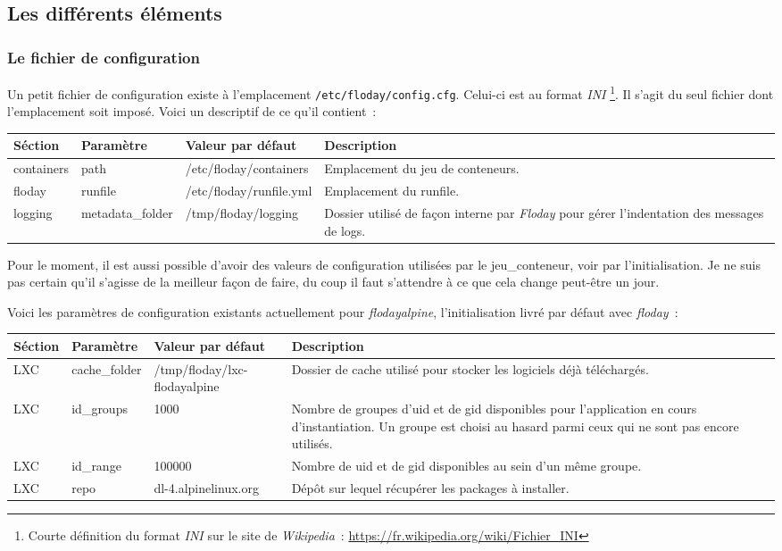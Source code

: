 \subsection{Les différents éléments}

\subsubsection{Le fichier de configuration}
Un petit fichier de configuration existe à l'emplacement {\tt/etc/floday/config.cfg}.
Celui-ci est au format \emph{INI}%
\footnote{Courte définition du format \emph{INI} sur le site de \emph{Wikipedia}~:
	\url{https://fr.wikipedia.org/wiki/Fichier_INI}
}.
Il s'agit du seul fichier dont l'emplacement soit imposé.
Voici un descriptif de ce qu'il contient~:
\newline

\begin{tabular}{|l|l|p{4cm}|p{4.1cm}|}
	\hline
	Séction & Paramètre & Valeur par défaut & Description \\
	\hline
	containers & path & /etc/floday/containers & Emplacement du jeu de conteneurs.\\
	floday & runfile & /etc/floday/runfile.yml & Emplacement du \gls{runfile}. \\
	logging & metadata\_folder & /tmp/floday/logging & Dossier utilisé de façon interne par \emph{Floday} pour gérer l'indentation des messages de logs. \\
	\hline
\end{tabular}
\newline

Pour le moment, il est aussi possible d'avoir des valeurs de configuration utilisées par le \gls{jeu_conteneur}, voir par l'\gls{initialisation}.
Je ne suis pas certain qu'il s'agisse de la meilleur façon de faire, du coup il faut s'attendre à ce que cela change peut-être un jour.

Voici les paramètres de configuration existants actuellement pour  \emph{flodayalpine}, l'initialisation livré par défaut avec \emph{floday}~:
\newline

\begin{tabular}{|l|l|p{4cm}|p{5.25cm}|}
	\hline
	Séction & Paramètre & Valeur par défaut & Description \\
	\hline
	LXC & cache\_folder & /tmp/floday/lxc-flodayalpine & Dossier de cache utilisé pour stocker les logiciels déjà téléchargés.\\
	LXC & id\_groups & 1000 & Nombre de groupes d'uid et de gid disponibles pour l'\gls{application} en cours d'\gls{instantiation}. Un groupe est choisi au hasard parmi ceux qui ne sont pas encore utilisés.\\
	LXC & id\_range & 100000 & Nombre de uid et de gid disponibles au sein d'un même groupe.\\
	LXC & repo & dl-4.alpinelinux.org & Dépôt sur lequel récupérer les packages à installer.\\
	\hline
\end{tabular}
\newline

